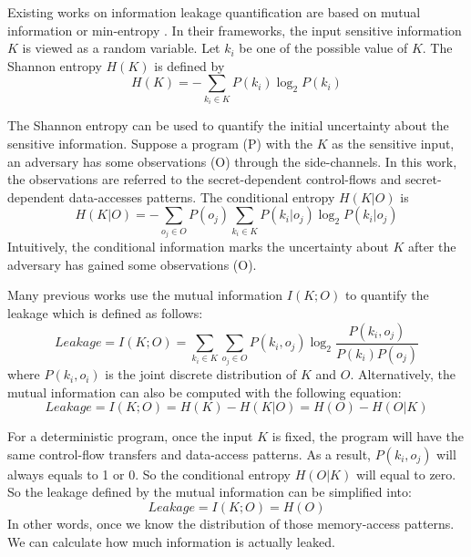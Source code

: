 Existing works on information leakage quantification are based on mutual information or 
min-entropy \cite{10.1007/978-3-642-00596-1_21}.
In their frameworks, the input sensitive
information $K$ is viewed as a random variable. Let $k_i$ be one of the possible
value of $K$. The Shannon entropy $H(K)$ is defined by
\begin{displaymath}
    H(K) = - \sum_{k_i {\in} K}P(k_i)\log_2P(k_i)
\end{displaymath}

The Shannon entropy can be used to quantify the initial uncertainty about the sensitive
information. Suppose a program (P) with the $K$ as
the sensitive input, an adversary has some observations (O) through the side-channels.
In this work, the observations are referred to the secret-dependent control-flows and
secret-dependent data-accesses patterns. The conditional entropy $H(K|O)$ is
\begin{displaymath}
    H(K|O) = - \sum_{o_j {\in} O} {P(o_j) \sum_{k_i {\in} K}{P(k_i|o_j)\log_2P(k_i|o_j)}}
\end{displaymath}
Intuitively, the conditional information marks the uncertainty about $K$ after the adversary
has gained some observations (O). 

Many previous works use the mutual information $I(K; O)$ to quantify the leakage which is defined 
as follows:
\begin{displaymath}
    \mathit{Leakage} = I(K;O) = \sum_{k_i {\in} K}{\sum_{o_j {\in} O}{P(k_i, o_j)\log_2\frac{P(k_i, o_j)}{P(k_i)P(o_j)}}}
\end{displaymath}
where $P(k_i, o_i)$ is the joint discrete distribution of $K$ and $O$.
Alternatively, the mutual information can also be computed with the following equation:
\begin{displaymath}
    \mathit{Leakage} = I(K;O) = H(K) - H(K|O) = H(O) - H(O|K)
\end{displaymath}

For a deterministic program, once the input $K$ is fixed, the program will have the same
control-flow transfers and data-access patterns. As a result, $P(k_i, o_j)$ will always
equals to 1 or 0. So the conditional entropy $H(O|K)$ will equal to zero. So the leakage defined
by the mutual information can be simplified into:
\begin{displaymath}
\label{mutual:information}
    \mathit{Leakage} = I(K;O) = H(O)
\end{displaymath}
In other words, once we know the distribution of those memory-access patterns. We can 
calculate how much information is actually leaked.

